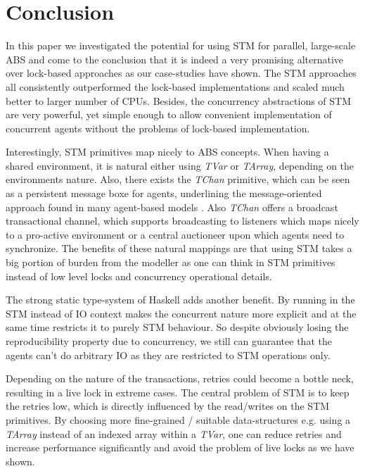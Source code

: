 \section{Conclusion} %
\label{sec:conclusion}

In this paper we investigated the potential for using STM for parallel, large-scale ABS and come to the conclusion that it is indeed a very promising alternative over lock-based approaches as our case-studies have shown. The STM approaches all consistently outperformed the lock-based implementations and scaled much better to larger number of CPUs. Besides, the concurrency abstractions of STM are very powerful, yet simple enough to allow convenient implementation of concurrent agents without the problems of lock-based implementation.

Interestingly, STM primitives map nicely to ABS concepts. When having a shared environment, it is natural either using \textit{TVar} or \textit{TArray}, depending on the environments nature. Also, there exists the \textit{TChan} primitive, which can be seen as a persistent message boxe for agents, underlining the message-oriented approach found in many agent-based models \cite{agha_actors:_1986, wooldridge_introduction_2009}. Also \textit{TChan} offers a broadcast transactional channel, which supports broadcasting to listeners which maps nicely to a pro-active environment or a central auctioneer upon which agents need to synchronize. The benefits of these natural mappings are that using STM takes a big portion of burden from the modeller as one can think in STM primitives instead of low level locks and concurrency operational details.

The strong static type-system of Haskell adds another benefit. By running in the STM instead of IO context makes the concurrent nature more explicit and at the same time restricts it to purely STM behaviour. So despite obviously losing the reproducibility property due to concurrency, we still can guarantee that the agents can't do arbitrary IO as they are restricted to STM operations only.

Depending on the nature of the transactions, retries could become a bottle neck, resulting in a live lock in extreme cases. The central problem of STM is to keep the retries low, which is directly influenced by the read/writes on the STM primitives. By choosing more fine-grained / suitable data-structures e.g. using a \textit{TArray} instead of an indexed array within a \textit{TVar}, one can reduce retries and increase performance significantly and avoid the problem of live locks as we have shown.

